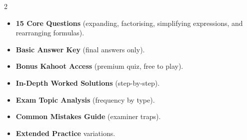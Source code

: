 \documentclass[11pt,a4paper]{article}
\newcommand{\FullReleaseDate}{April 30, 2026}
\begin{document}
\vspace{8pt}

\begin{multicols}{2}
  \begin{tcolorbox}[card, title=\sffamily\bfseries\textcolor{white}{\faHandPointDown\ TODAY (Simplified Version)}, colbacktitle=mainblue, boxed title style={sharp corners, boxrule=0pt}]
    \begin{itemize}[leftmargin=1.2em, itemsep=2pt]
      \item \small \textbf{15 Core Questions} (expanding, factorising, simplifying expressions, and rearranging formulas).
      \item \small \textbf{Basic Answer Key} (final answers only).
      \item \small \textbf{Bonus Kahoot Access} (premium quiz, free to play).
    \end{itemize}
  \end{tcolorbox}

  \columnbreak

  \begin{tcolorbox}[card, title=\sffamily\bfseries\textcolor{white}{\faRocket\ ON \FullReleaseDate\ (Full Upgrade)}, colbacktitle=mainblue, boxed title style={sharp corners, boxrule=0pt}]
    \begin{itemize}[leftmargin=1.2em, itemsep=2pt]
      \item \small \textbf{In-Depth Worked Solutions} (step-by-step).
      \item \small \textbf{Exam Topic Analysis} (frequency by type).
      \item \small \textbf{Common Mistakes Guide} (examiner traps).
      \item \small \textbf{Extended Practice} variations.
    \end{itemize}
  \end{tcolorbox}
\end{multicols}
\end{document}
